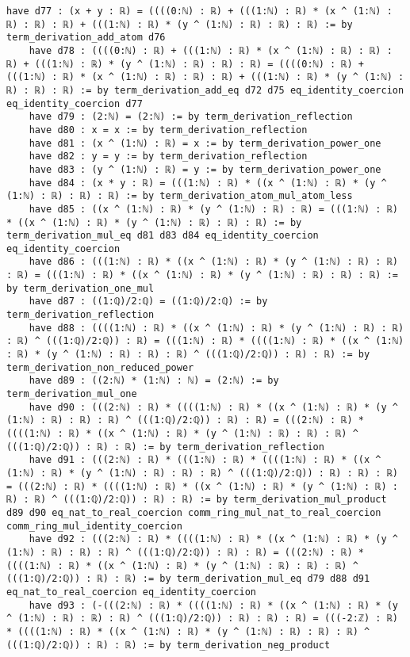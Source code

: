 \documentclass{article}
\begin{document}
\begin{tcolorbox}[colback=white!10, width=\linewidth]
\begin{lstlisting}[language=Lean4]
    have d77 : (x + y : ℝ) = ((((0:ℕ) : ℝ) + (((1:ℕ) : ℝ) * (x ^ (1:ℕ) : ℝ) : ℝ) : ℝ) + (((1:ℕ) : ℝ) * (y ^ (1:ℕ) : ℝ) : ℝ) : ℝ) := by term_derivation_add_atom d76
    have d78 : ((((0:ℕ) : ℝ) + (((1:ℕ) : ℝ) * (x ^ (1:ℕ) : ℝ) : ℝ) : ℝ) + (((1:ℕ) : ℝ) * (y ^ (1:ℕ) : ℝ) : ℝ) : ℝ) = ((((0:ℕ) : ℝ) + (((1:ℕ) : ℝ) * (x ^ (1:ℕ) : ℝ) : ℝ) : ℝ) + (((1:ℕ) : ℝ) * (y ^ (1:ℕ) : ℝ) : ℝ) : ℝ) := by term_derivation_add_eq d72 d75 eq_identity_coercion eq_identity_coercion d77
    have d79 : (2:ℕ) = (2:ℕ) := by term_derivation_reflection
    have d80 : x = x := by term_derivation_reflection
    have d81 : (x ^ (1:ℕ) : ℝ) = x := by term_derivation_power_one
    have d82 : y = y := by term_derivation_reflection
    have d83 : (y ^ (1:ℕ) : ℝ) = y := by term_derivation_power_one
    have d84 : (x * y : ℝ) = (((1:ℕ) : ℝ) * ((x ^ (1:ℕ) : ℝ) * (y ^ (1:ℕ) : ℝ) : ℝ) : ℝ) := by term_derivation_atom_mul_atom_less
    have d85 : ((x ^ (1:ℕ) : ℝ) * (y ^ (1:ℕ) : ℝ) : ℝ) = (((1:ℕ) : ℝ) * ((x ^ (1:ℕ) : ℝ) * (y ^ (1:ℕ) : ℝ) : ℝ) : ℝ) := by term_derivation_mul_eq d81 d83 d84 eq_identity_coercion eq_identity_coercion
    have d86 : (((1:ℕ) : ℝ) * ((x ^ (1:ℕ) : ℝ) * (y ^ (1:ℕ) : ℝ) : ℝ) : ℝ) = (((1:ℕ) : ℝ) * ((x ^ (1:ℕ) : ℝ) * (y ^ (1:ℕ) : ℝ) : ℝ) : ℝ) := by term_derivation_one_mul
    have d87 : ((1:ℚ)/2:ℚ) = ((1:ℚ)/2:ℚ) := by term_derivation_reflection
    have d88 : ((((1:ℕ) : ℝ) * ((x ^ (1:ℕ) : ℝ) * (y ^ (1:ℕ) : ℝ) : ℝ) : ℝ) ^ (((1:ℚ)/2:ℚ)) : ℝ) = (((1:ℕ) : ℝ) * ((((1:ℕ) : ℝ) * ((x ^ (1:ℕ) : ℝ) * (y ^ (1:ℕ) : ℝ) : ℝ) : ℝ) ^ (((1:ℚ)/2:ℚ)) : ℝ) : ℝ) := by term_derivation_non_reduced_power
    have d89 : ((2:ℕ) * (1:ℕ) : ℕ) = (2:ℕ) := by term_derivation_mul_one
    have d90 : (((2:ℕ) : ℝ) * ((((1:ℕ) : ℝ) * ((x ^ (1:ℕ) : ℝ) * (y ^ (1:ℕ) : ℝ) : ℝ) : ℝ) ^ (((1:ℚ)/2:ℚ)) : ℝ) : ℝ) = (((2:ℕ) : ℝ) * ((((1:ℕ) : ℝ) * ((x ^ (1:ℕ) : ℝ) * (y ^ (1:ℕ) : ℝ) : ℝ) : ℝ) ^ (((1:ℚ)/2:ℚ)) : ℝ) : ℝ) := by term_derivation_reflection
    have d91 : (((2:ℕ) : ℝ) * (((1:ℕ) : ℝ) * ((((1:ℕ) : ℝ) * ((x ^ (1:ℕ) : ℝ) * (y ^ (1:ℕ) : ℝ) : ℝ) : ℝ) ^ (((1:ℚ)/2:ℚ)) : ℝ) : ℝ) : ℝ) = (((2:ℕ) : ℝ) * ((((1:ℕ) : ℝ) * ((x ^ (1:ℕ) : ℝ) * (y ^ (1:ℕ) : ℝ) : ℝ) : ℝ) ^ (((1:ℚ)/2:ℚ)) : ℝ) : ℝ) := by term_derivation_mul_product d89 d90 eq_nat_to_real_coercion comm_ring_mul_nat_to_real_coercion comm_ring_mul_identity_coercion
    have d92 : (((2:ℕ) : ℝ) * ((((1:ℕ) : ℝ) * ((x ^ (1:ℕ) : ℝ) * (y ^ (1:ℕ) : ℝ) : ℝ) : ℝ) ^ (((1:ℚ)/2:ℚ)) : ℝ) : ℝ) = (((2:ℕ) : ℝ) * ((((1:ℕ) : ℝ) * ((x ^ (1:ℕ) : ℝ) * (y ^ (1:ℕ) : ℝ) : ℝ) : ℝ) ^ (((1:ℚ)/2:ℚ)) : ℝ) : ℝ) := by term_derivation_mul_eq d79 d88 d91 eq_nat_to_real_coercion eq_identity_coercion
    have d93 : (-(((2:ℕ) : ℝ) * ((((1:ℕ) : ℝ) * ((x ^ (1:ℕ) : ℝ) * (y ^ (1:ℕ) : ℝ) : ℝ) : ℝ) ^ (((1:ℚ)/2:ℚ)) : ℝ) : ℝ) : ℝ) = (((-2:ℤ) : ℝ) * ((((1:ℕ) : ℝ) * ((x ^ (1:ℕ) : ℝ) * (y ^ (1:ℕ) : ℝ) : ℝ) : ℝ) ^ (((1:ℚ)/2:ℚ)) : ℝ) : ℝ) := by term_derivation_neg_product

\end{lstlisting}
\end{tcolorbox}
\end{document}
